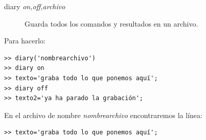 \begin{description}
\item [{diary \textsl{on,off,archivo}}]Guarda todos los
  comandos y resultados en un archivo.
\end{description}
Para hacerlo:

\begin{verbatim}
>> diary('nombrearchivo')
>> diary on
>> texto='graba todo lo que ponemos aquí';
>> diary off
>> texto2='ya ha parado la grabación';
\end{verbatim}

En el archivo de nombre \emph{nombrearchivo} encontraremos la línea:

\begin{verbatim}
>> texto='graba todo lo que ponemos aquí';
\end{verbatim}
